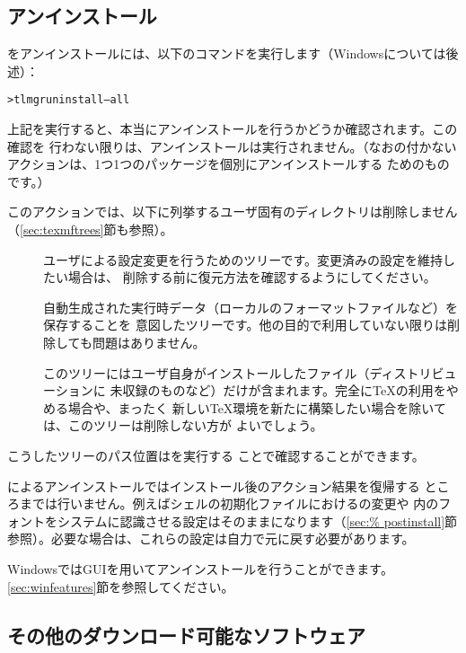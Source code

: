 \documentclass[uplatex,dvipdfmx]{jsarticle}
\begin{document}
\subsection{アンインストール}
\label{sec:uninstall}

\TL をアンインストールには、以下のコマンドを実行します（Windowsについては後述）：
%
\begin{alltt}
> tlmgr uninstall --all
\end{alltt}
%
上記を実行すると、本当にアンインストールを行うかどうか確認されます。この確認を
行わない限りは、アンインストールは実行されません。（なおの付かない
アクションは、1つ1つのパッケージを個別にアンインストールする
ためのものです。）

このアクションでは、以下に列挙するユーザ固有のディレクトリは削除しません
（\ref{sec:texmftrees}節も参照）。
%
\begin{description}
\item[]
ユーザによる設定変更を行うためのツリーです。変更済みの設定を維持したい場合は、
削除する前に復元方法を確認するようにしてください。

\item[]
自動生成された実行時データ（ローカルのフォーマットファイルなど）を保存することを
意図したツリーです。他の目的で利用していない限りは削除しても問題はありません。

\item[]
このツリーにはユーザ自身がインストールしたファイル（ディストリビューションに
未収録のものなど）だけが含まれます。完全に\TeX の利用をやめる場合や、まったく
新しい\TeX 環境を新たに構築したい場合を除いては、このツリーは削除しない方が
よいでしょう。
\end{description}
%
こうしたツリーのパス位置はを実行する
ことで確認することができます。

によるアンインストールではインストール後のアクション結果を復帰する
ところまでは行いません。例えばシェルの初期化ファイルにおけるの変更や
\TL 内のフォントをシステムに認識させる設定はそのままになります（\ref{sec:%
postinstall}節参照）。必要な場合は、これらの設定は自力で元に戻す必要があります。

WindowsではGUIを用いてアンインストールを行うことができます。
\ref{sec:winfeatures}節を参照してください。

\subsection{その他のダウンロード可能なソフトウェア}
\end{document}

